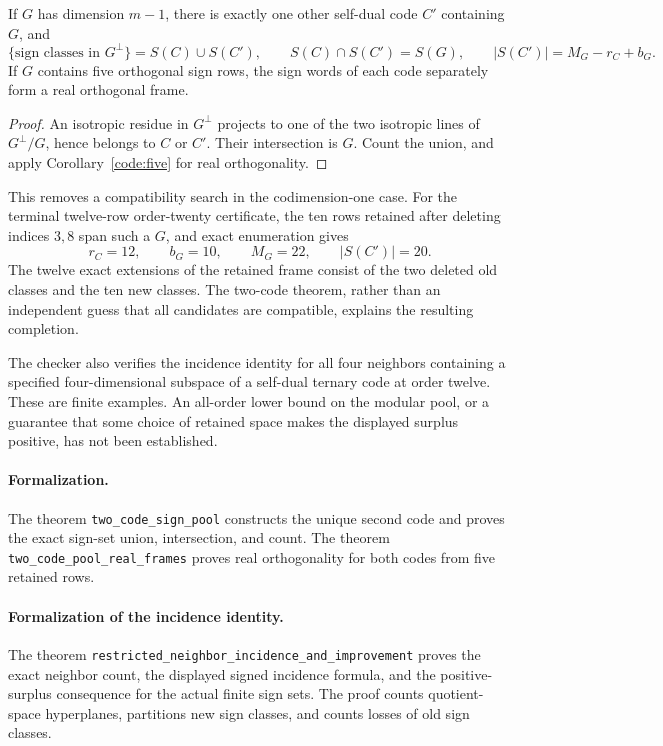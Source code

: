 \begin{corollary}
\label{code:two-codes}
If $G$ has dimension $m-1$, there is exactly one other self-dual
code $C'$ containing $G$, and
\[
 \{ \text{sign classes in }G^\perp\}=S(C)\cup S(C'),\qquad
 S(C)\cap S(C')=S(G),\qquad
 |S(C')|=M_G-r_C+b_G.
\]
If $G$ contains five orthogonal sign rows, the sign words of each
code separately form a real orthogonal frame.
\end{corollary}
\begin{proof}
An isotropic residue in $G^\perp$ projects to one of the two
isotropic lines of $G^\perp/G$, hence belongs to $C$ or $C'$.
Their intersection is $G$. Count the union, and apply
Corollary~\ref{code:five} for real orthogonality.
\end{proof}

This removes a compatibility search in the codimension-one case.
For the terminal twelve-row order-twenty certificate, the ten rows
retained after deleting indices $3,8$ span such a $G$, and exact
enumeration gives
\[
 r_C=12,\qquad b_G=10,\qquad M_G=22,\qquad |S(C')|=20.
\]
The twelve exact extensions of the retained frame consist of the two
deleted old classes and the ten new classes. The two-code theorem,
rather than an independent guess that all candidates are compatible,
explains the resulting completion.

The checker also verifies the incidence identity for all four
neighbors containing a specified four-dimensional subspace of a
self-dual ternary code at order twelve. These are finite examples.
An all-order lower bound on the modular pool, or a guarantee that
some choice of retained space makes the displayed surplus positive,
has not been established.

\paragraph{Formalization.} The theorem \texttt{two\_\allowbreak code\_\allowbreak sign\_\allowbreak pool} constructs the unique second code and proves the exact sign-set union, intersection, and count. The theorem \texttt{two\_\allowbreak code\_\allowbreak pool\_\allowbreak real\_\allowbreak frames} proves real orthogonality for both codes from five retained rows.

\paragraph{Formalization of the incidence identity.} The theorem \texttt{restricted\_\allowbreak neighbor\_\allowbreak incidence\_\allowbreak and\_\allowbreak improvement} proves the exact neighbor count, the displayed signed incidence formula, and the positive-surplus consequence for the actual finite sign sets. The proof counts quotient-space hyperplanes, partitions new sign classes, and counts losses of old sign classes.
